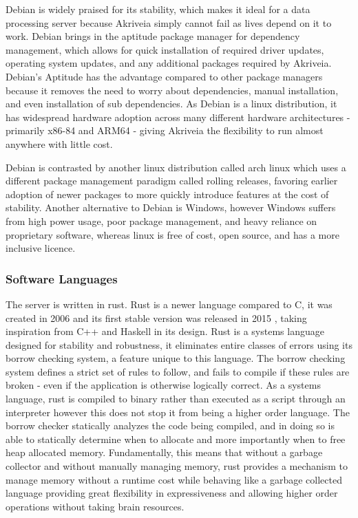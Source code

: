\bigskip
Debian is widely praised for its stability, which makes it ideal for a data processing server because Akriveia simply cannot fail as lives depend on it to work.
Debian brings in the aptitude package manager for dependency management, which allows for quick installation of required driver updates, operating system updates, and any additional packages required by Akriveia.
Debian's Aptitude has the advantage compared to other package managers because it removes the need to worry about dependencies, manual installation, and even installation of sub dependencies.
As Debian is a linux distribution, it has widespread hardware adoption across many different hardware architectures - primarily x86-84 and ARM64 - giving Akriveia the flexibility to run almost anywhere with little cost.

\bigskip
Debian is contrasted by another linux distribution called arch linux which uses a different package management paradigm called rolling releases, favoring earlier adoption of newer packages to more quickly introduce features at the cost of stability.
Another alternative to Debian is Windows, however Windows suffers from high power usage, poor package management, and heavy reliance on proprietary software, whereas linux is free of cost, open source, and has a more inclusive licence.

\bigskip
\subsubsection{Software Languages}
The server is written in rust.
Rust is a newer language compared to C, it was created in 2006 \cite{rust_graydon_interview} and its first stable version was released in 2015 \cite{rust_releases}, taking inspiration from C++ and Haskell in its design.
Rust is a systems language designed for stability and robustness, it eliminates entire classes of errors using its borrow checking system, a feature unique to this language.
The borrow checking system defines a strict set of rules to follow, and fails to compile if these rules are broken - even if the application is otherwise logically correct.
As a systems language, rust is compiled to binary rather than executed as a script through an interpreter however this does not stop it from being a higher order language.
The borrow checker statically analyzes the code being compiled, and in doing so is able to statically determine when to allocate and more importantly when to free heap allocated memory.
Fundamentally, this means that without a garbage collector and without manually managing memory, rust provides a mechanism to manage memory without a runtime cost while behaving like a garbage collected language providing great flexibility in expressiveness and allowing higher order operations without taking brain resources.

